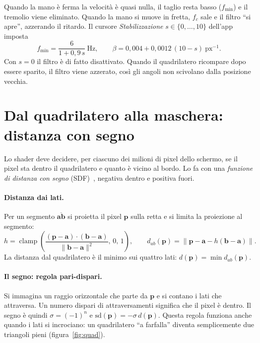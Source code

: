 \documentclass[11pt,a4paper]{article}
\newcommand{\clamp}{\operatorname{clamp}}
\newcommand{\vect}[1]{\mathbf{#1}}
\begin{document}
Quando la mano è ferma la velocità è quasi nulla, il taglio resta basso ($f_{\min}$) e il tremolio
viene eliminato. Quando la mano si muove in fretta, $f_c$ sale e il filtro ``si apre'', azzerando
il ritardo. Il cursore \emph{Stabilizzazione} $s\in\{0,\dots,10\}$ dell'app imposta
\begin{equation}
  f_{\min}=\frac{6}{1+0{,}9\,s}\ \text{Hz},\qquad \beta=0{,}004+0{,}0012\,(10-s)\ \text{px}^{-1}.
\end{equation}
Con $s=0$ il filtro è di fatto disattivato. Quando il quadrilatero ricompare dopo essere sparito,
il filtro viene azzerato, così gli angoli non scivolano dalla posizione vecchia.

\section{Dal quadrilatero alla maschera: distanza con segno}
\label{sec:sdf}

Lo shader deve decidere, per ciascuno dei milioni di pixel dello schermo, se il pixel sta dentro
il quadrilatero e quanto è vicino al bordo. Lo fa con una \emph{funzione di distanza con segno}
(SDF)~\cite{quilez}, negativa dentro e positiva fuori.

\paragraph{Distanza dai lati.} Per un segmento $\overline{\vect{a}\vect{b}}$ si proietta il
pixel $\vect{p}$ sulla retta e si limita la proiezione al segmento:
\begin{equation}
  h=\clamp\!\left(\frac{(\vect{p}-\vect{a})\cdot(\vect{b}-\vect{a})}{\|\vect{b}-\vect{a}\|^2},\,0,\,1\right),
  \qquad d_{ab}(\vect{p})=\bigl\|\vect{p}-\vect{a}-h(\vect{b}-\vect{a})\bigr\|.
\end{equation}
La distanza dal quadrilatero è il minimo sui quattro lati: $d(\vect{p})=\min d_{ab}(\vect{p})$.

\paragraph{Il segno: regola pari-dispari.} Si immagina un raggio orizzontale che parte da
$\vect{p}$ e si contano i lati che attraversa. Un numero dispari di attraversamenti significa
che il pixel è dentro. Il segno è quindi $\sigma=(-1)^{n}$ e $\mathrm{sd}(\vect{p})=-\sigma\,d(\vect{p})$.
Questa regola funziona anche quando i lati si incrociano: un quadrilatero ``a farfalla''
diventa semplicemente due triangoli pieni (figura~\ref{fig:quad}).
\end{document}
